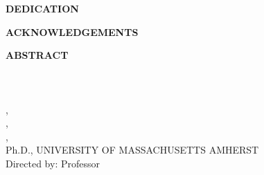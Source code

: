 \newpage

\thispagestyle{empty}
\begin{center}
\textbf{DEDICATION}\\[1.5cm]
\dedfill
\end{center}
\newpage

\thispagestyle{plain}
\doublespacing
\setcounter{page}{5}
{}

\begin{center}
\textbf{ACKNOWLEDGEMENTS}
\end{center}

\acknowledgementstfill

\newpage

\thispagestyle{plain}
{}
\begin{center}
\textbf{ABSTRACT}\\
\MakeUppercase{\large \distitle}\\
\MakeUppercase{\monthyear}\\
\MakeUppercase{\authname}\\
\MakeUppercase{\associatedegree,
\associateinstitution}\\
\MakeUppercase{\undergraddegree, \undergradinstitution}\\
\MakeUppercase{\mastersdegree, \mastersinstitution}\\
Ph.D., UNIVERSITY OF MASSACHUSETTS AMHERST\\
Directed by: Professor \advisorname
\end{center}
\sloppy
\abstractfill
\newpage

\singlespacing
\thispagestyle{plain}
\tableofcontents
\newpage

{}
\thispagestyle{plain}
\listoftables
\newpage

{}
\thispagestyle{plain}
\listoffigures
\newpage
